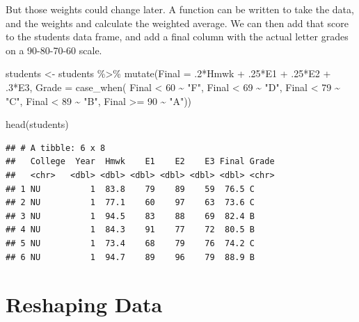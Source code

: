 \documentclass[
]{book}
\newenvironment{Shaded}{\begin{snugshade}}{\end{snugshade}}
\newcommand{\AttributeTok}[1]{\textcolor[rgb]{0.77,0.63,0.00}{#1}}
\newcommand{\DecValTok}[1]{\textcolor[rgb]{0.00,0.00,0.81}{#1}}
\newcommand{\FunctionTok}[1]{\textcolor[rgb]{0.00,0.00,0.00}{#1}}
\newcommand{\NormalTok}[1]{#1}
\newcommand{\OtherTok}[1]{\textcolor[rgb]{0.56,0.35,0.01}{#1}}
\newcommand{\SpecialCharTok}[1]{\textcolor[rgb]{0.00,0.00,0.00}{#1}}
\newcommand{\StringTok}[1]{\textcolor[rgb]{0.31,0.60,0.02}{#1}}
\begin{document}
But those weights could change later. A function can be written to take the data, and the weights and calculate the weighted average. We can then add that score to the students data frame, and add a final column with the actual letter grades on a 90-80-70-60 scale.

\begin{Shaded}
\begin{Highlighting}[]
\NormalTok{students }\OtherTok{\textless{}{-}}\NormalTok{ students }\SpecialCharTok{\%\textgreater{}\%} 
  \FunctionTok{mutate}\NormalTok{(}\AttributeTok{Final =}\NormalTok{ .}\DecValTok{2}\SpecialCharTok{*}\NormalTok{Hmwk }\SpecialCharTok{+}\NormalTok{ .}\DecValTok{25}\SpecialCharTok{*}\NormalTok{E1 }\SpecialCharTok{+}\NormalTok{ .}\DecValTok{25}\SpecialCharTok{*}\NormalTok{E2 }\SpecialCharTok{+}\NormalTok{ .}\DecValTok{3}\SpecialCharTok{*}\NormalTok{E3,}
         \AttributeTok{Grade =} \FunctionTok{case\_when}\NormalTok{(}
\NormalTok{           Final }\SpecialCharTok{\textless{}} \DecValTok{60} \SpecialCharTok{\textasciitilde{}} \StringTok{"F"}\NormalTok{,}
\NormalTok{           Final }\SpecialCharTok{\textless{}} \DecValTok{69} \SpecialCharTok{\textasciitilde{}} \StringTok{"D"}\NormalTok{,}
\NormalTok{           Final }\SpecialCharTok{\textless{}} \DecValTok{79} \SpecialCharTok{\textasciitilde{}} \StringTok{"C"}\NormalTok{,}
\NormalTok{           Final }\SpecialCharTok{\textless{}} \DecValTok{89} \SpecialCharTok{\textasciitilde{}} \StringTok{"B"}\NormalTok{,}
\NormalTok{           Final }\SpecialCharTok{\textgreater{}=} \DecValTok{90} \SpecialCharTok{\textasciitilde{}} \StringTok{"A"}\NormalTok{))}

\FunctionTok{head}\NormalTok{(students)}
\end{Highlighting}
\end{Shaded}

\begin{verbatim}
## # A tibble: 6 x 8
##   College  Year  Hmwk    E1    E2    E3 Final Grade
##   <chr>   <dbl> <dbl> <dbl> <dbl> <dbl> <dbl> <chr>
## 1 NU          1  83.8    79    89    59  76.5 C    
## 2 NU          1  77.1    60    97    63  73.6 C    
## 3 NU          1  94.5    83    88    69  82.4 B    
## 4 NU          1  84.3    91    77    72  80.5 B    
## 5 NU          1  73.4    68    79    76  74.2 C    
## 6 NU          1  94.7    89    96    79  88.9 B
\end{verbatim}

\hypertarget{reshaping-data}{%
\chapter{Reshaping Data}\label{reshaping-data}}
\end{document}
